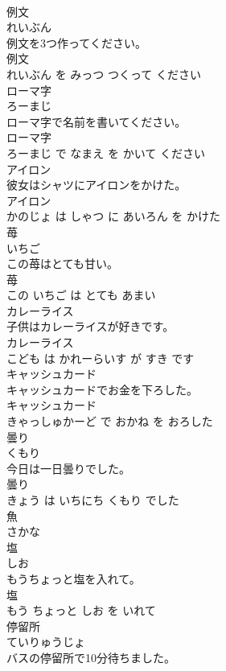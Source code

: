 \documentclass[8pt]{extreport}
\begin{document}
\begin{CJK}{UTF8}{min}
\\	例文	
\\	れいぶん			
\\	例文を3つ作ってください。	
\\	例文 
\\	れいぶん を みっつ つくって ください			
\\	ローマ字	
\\	ろーまじ			
\\	ローマ字で名前を書いてください。	
\\	ローマ字 
\\	ろーまじ で なまえ を かいて ください			
\\	アイロン	
\\	彼女はシャツにアイロンをかけた。	
\\	アイロン 
\\	かのじょ は しゃつ に あいろん を かけた			
\\	苺	
\\	いちご			
\\	この苺はとても甘い。	
\\	苺 
\\	この いちご は とても あまい			
\\	カレーライス	
\\	子供はカレーライスが好きです。	
\\	カレーライス 
\\	こども は かれーらいす が すき です			
\\	キャッシュカード	
\\	キャッシュカードでお金を下ろした。	
\\	キャッシュカード 
\\	きゃっしゅかーど で おかね を おろした			
\\	曇り	
\\	くもり			
\\	今日は一日曇りでした。	
\\	曇り 
\\	きょう は いちにち くもり でした			
\\	魚	
\\	さかな			
\\	塩	
\\	しお			
\\	もうちょっと塩を入れて。	
\\	塩 
\\	もう ちょっと しお を いれて			
\\	停留所	
\\	ていりゅうじょ			
\\	バスの停留所で10分待ちました。	

\end{CJK}
\end{document}
